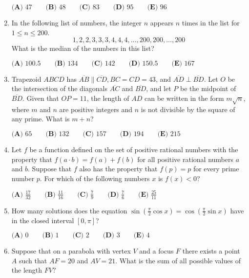 \documentclass{article}
\begin{document}
\begin{enumerate}[label=\arabic*., itemsep=0.5em]
\(\textbf{(A) } 47\qquad\textbf{(B) } 48\qquad\textbf{(C) } 83\qquad\textbf{(D) } 95\qquad\textbf{(E) } 96\qquad\)\par \vspace{0.5em}\item In the following list of numbers, the integer \(n\) appears \(n\) times in the list for \(1\le n \le 200\).
\begin{equation*}
1,2,2,3,3,3,4,4,4,\ldots,200,200,\ldots,200
\end{equation*}
What is the median of the numbers in this list?

\(\textbf{(A) }100.5 \qquad \textbf{(B) }134 \qquad \textbf{(C) }142 \qquad \textbf{(D) }150.5\qquad \textbf{(E) }167\)\par \vspace{0.5em}\item Trapezoid \(ABCD\) has \(\overline{AB}\parallel\overline{CD},BC=CD=43\), and \(\overline{AD}\perp\overline{BD}\). Let \(O\) be the intersection of the diagonals \(\overline{AC}\) and \(\overline{BD}\), and let \(P\) be the midpoint of \(\overline{BD}\). Given that \(OP=11\), the length of \(AD\) can be written in the form \(m\sqrt{n}\), where \(m\) and \(n\) are positive integers and \(n\) is not divisible by the square of any prime. What is \(m+n\)?

\(\textbf{(A) }65 \qquad \textbf{(B) }132 \qquad \textbf{(C) }157 \qquad \textbf{(D) }194\qquad \textbf{(E) }215\)\par \vspace{0.5em}\item Let \(f\) be a function defined on the set of positive rational numbers with the property that \(f(a\cdot b)=f(a)+f(b)\) for all positive rational numbers \(a\) and \(b\). Suppose that \(f\) also has the property that \(f(p)=p\) for every prime number \(p\). For which of the following numbers \(x\) is \(f(x)<0\)?

\(\textbf{(A) }\frac{17}{32} \qquad \textbf{(B) }\frac{11}{16} \qquad \textbf{(C) }\frac79 \qquad \textbf{(D) }\frac76\qquad \textbf{(E) }\frac{25}{11}\)\par \vspace{0.5em}\item How many solutions does the equation \(\sin \left( \frac{\pi}2 \cos x\right)=\cos \left( \frac{\pi}2 \sin x\right)\) have in the closed interval \([0,\pi]\)?

\(\textbf{(A) }0 \qquad \textbf{(B) }1 \qquad \textbf{(C) }2 \qquad \textbf{(D) }3\qquad \textbf{(E) }4\)\par \vspace{0.5em}\item Suppose that on a parabola with vertex \(V\) and a focus \(F\) there exists a point \(A\) such that \(AF=20\) and \(AV=21\). What is the sum of all possible values of the length \(FV?\)


\end{enumerate}
\end{document}
